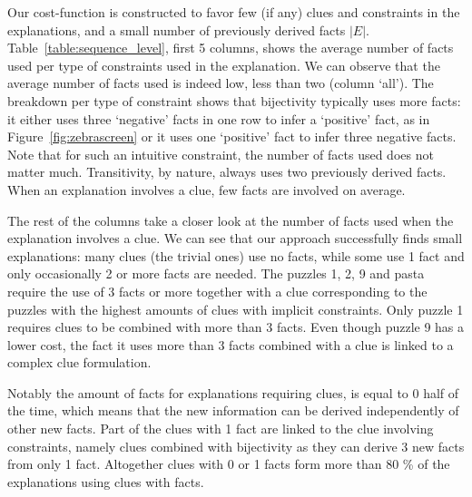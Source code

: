
Our cost-function is constructed to favor few (if any) clues and constraints in the explanations, and a small number of previously derived facts $|E|$.
Table~\ref{table:sequence_level}, first 5 columns, shows the average number of facts used per type of constraints used in the explanation.
We can observe that the average number of facts used is indeed low, less than two (column `all').
The breakdown per type of constraint shows that bijectivity typically uses more facts: it either uses three `negative' facts in one row to infer a `positive' fact, as in Figure~\ref{fig:zebrascreen} or it uses one `positive' fact to infer three negative facts.
Note that for such an intuitive constraint, the number of facts used does not matter much. 
Transitivity, by nature, always uses two previously derived facts.
When an explanation involves a clue, few facts are involved on average. 

The rest of the columns take a closer look at the number of facts used when the explanation involves a clue. We can see that our approach successfully finds small explanations: many clues (the trivial ones) use no facts, while some use 1 fact and only occasionally 2 or more facts are needed. 
The puzzles 1, 2, 9 and pasta require the use of 3 facts or more together with a clue corresponding to the puzzles with the highest amounts of clues with implicit constraints. Only puzzle 1 requires clues to be combined with more than 3 facts.
Even though puzzle 9 has a lower cost, the fact it uses more than 3 facts combined with a clue is linked to a complex clue formulation.


Notably the amount of facts for explanations requiring clues, is equal to 0 half of the time, which means that the new information can 
be derived independently of other new facts. 
Part of the clues with 1 fact are linked to the clue involving constraints, namely clues combined with bijectivity as they can derive  3 new facts from only 1 fact.
Altogether clues with 0 or 1 facts form more than 80 \% of the explanations using clues with facts. 


